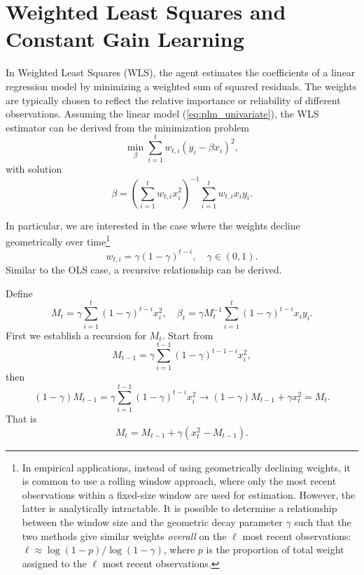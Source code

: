 \documentclass[11pt]{article}
\begin{document}
\section{Weighted Least Squares and Constant Gain Learning}

In Weighted Least Squares (WLS), the agent estimates the coefficients of a linear regression model by minimizing a weighted sum of squared residuals.
The weights are typically chosen to reflect the relative importance or reliability of different observations. Assuming the linear model (\ref{eq:plm_univariate}),
the WLS estimator can be derived from the minimization problem
\begin{equation}
    \min_{\beta} \sum^t_{i=1} {w_{t,i}} (y_i - \beta x_i) ^2,
\end{equation}
with solution
\begin{equation}
    {\beta} = \left(\sum^t_{i=1} {w_{t,i}} x_i^2 \right)^{-1} \sum^t_{i=1} {w_{t,i}} x_i y_i.
\end{equation}

In particular, we are interested in the case where the weights decline geometrically over time\footnote{
    In empirical applications, instead of using geometrically declining weights, it is common to use a rolling window approach, where only the most recent observations within a fixed-size window are used for estimation. 
    However, the latter is analytically intractable.
    It is possible to determine a relationship between the window size and the geometric decay parameter $\gamma$ such that the two methods give similar weights \emph{overall} on the $\ell$ most recent observations:
    $\ell \approx \log(1 - p) / \log(1 - \gamma)$, where $p$ is the proportion of total weight assigned to the $\ell$ most recent observations.
}
\begin{equation}
    w_{t,i} = \gamma (1 - \gamma)^{t-i}, \quad \gamma \in (0,1).
\end{equation}
Similar to the OLS case, a recursive relationship can be derived.

Define 
\begin{equation}
    M_t = \gamma \sum^t_{i=1} {(1 - \gamma)^{t-i}} x_i^2, \quad \beta_t = \gamma M^{-1}_t \sum^t_{i=1} {(1 - \gamma)^{t-i}} x_i y_i.
\end{equation}
First we establish a recursion for $M_t$. Start from
\begin{equation}
M_{t-1} = \gamma \sum^{t-1}_{i=1} {(1 - \gamma)^{t-1-i}} x_i^2,
\end{equation}
then
\begin{equation}
(1 - \gamma) M_{t-1} = \gamma \sum^{t-1}_{i=1} {(1 - \gamma)^{t-i}} x_i^2 \rightarrow (1 - \gamma) M_{t-1} + \gamma x_t^2 = M_t.
\end{equation}
That is
\begin{equation}
    M_t = M_{t-1} + \gamma \left(x_t^2 - M_{t-1} \right).
\end{equation}
\end{document}
